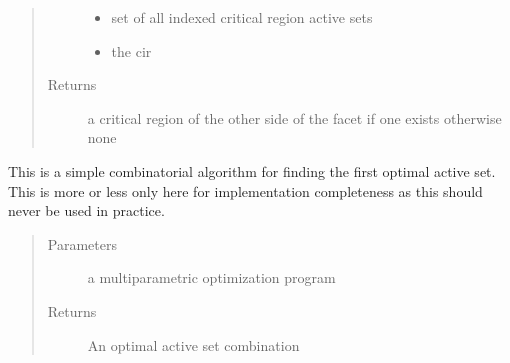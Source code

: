\documentclass[letterpaper,10pt,english]{sphinxmanual}
\begin{document}
\begin{fulllineitems}
\begin{quote}
\begin{description}
\begin{itemize}
\item {} 
\sphinxAtStartPar
{} \textendash{} set of all indexed critical region active sets

\item {} 
\sphinxAtStartPar
{} \textendash{} the cir

\end{itemize}

\item[{Returns}] \leavevmode
\sphinxAtStartPar
a critical region of the other side of the facet if one exists otherwise none

\end{description}\end{quote}

\end{fulllineitems}


\begin{fulllineitems}
\label{\detokenize{ppopt.mp_solvers:ppopt.mp_solvers.solver_utils.find_optimal_set}}
\sphinxAtStartPar
This is a simple combinatorial algorithm for finding the first optimal active set. This is more or less only here for
implementation completeness as this should never be used in practice.
\begin{quote}\begin{description}
\item[{Parameters}] \leavevmode
\sphinxAtStartPar
{} \textendash{} a multiparametric optimization program

\item[{Returns}] \leavevmode
\sphinxAtStartPar
An optimal active set combination

\end{description}\end{quote}

\end{fulllineitems}

\end{document}
